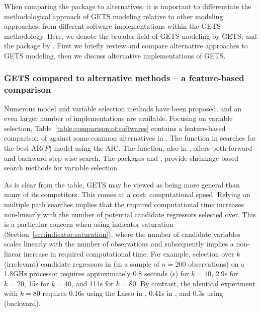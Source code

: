 \documentclass[article,nojss]{jss}
\begin{document}
When comparing the  package  to alternatives, it is important to differentiate the methodological approach of GETS modeling relative to other modeling approaches, from different software implementations within the GETS methodology. Here, we denote the broader field of GETS modeling by GETS, and the  package by . First we briefly review and compare alternative approaches to GETS modeling, then we discuss alternative implementations of GETS.

\subsubsection{GETS compared to alternative methods -- a feature-based comparison}
\label{sec:GETSalt}

Numerous model and variable selection methods have been proposed, and
an even larger number of implementations are available. Focusing on
variable selection, Table~\ref{table:comparison:of:softwares} contains
a feature-based comparison of  against some common
alternatives in . The  function in 
\citep{RCoreTeam2016} searches for the best AR($P$) model using the
AIC. The  function, also in , offers both
forward and backward step-wise search. The packages 
\citep{HastieEfron2013} and 
\citep{friedman2010regularization}, provide shrinkage-based search
methods for variable selection.

As is clear from the table, GETS may be viewed as being more general than many of its competitors. This comes at a cost: computational speed. Relying on multiple path searches implies that the required computational time increases non-linearly with the number of potential candidate regressors selected over. This is a particular concern when using indicator saturation (Section~\ref{sec:indicator:saturation}), where the number of candidate variables scales linearly with the number of observations and subsequently implies a non-linear increase in required computational time. For example, selection over $k$ (irrelevant) candidate regressors in  (in a sample of $n=200$ observations) on a 1.8GHz processor requires approximately 0.8 seconds (s) for $k=10$, 2.9s for $k=20$, 15s for $k=40$, and 114s for $k=80$. By contrast, the identical experiment with $k=80$ requires 0.16s using the Lasso in , 0.41s in , and 0.3s using  (backward).
\end{document}
